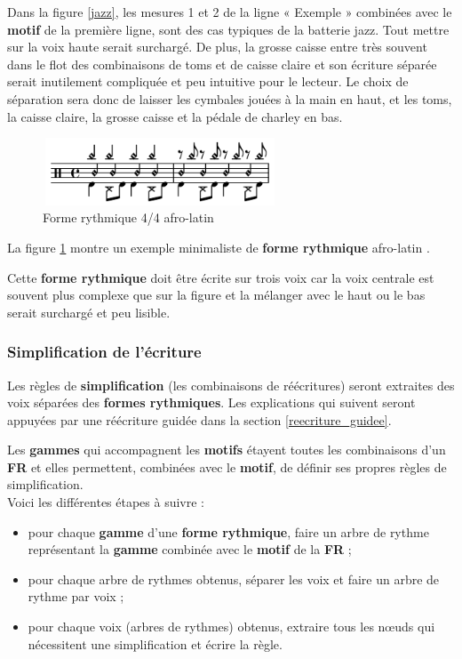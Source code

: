 Dans la figure \ref{jazz}, les mesures 1 et 2 de la ligne « Exemple » combinées
avec le \textbf{motif} de la première ligne, sont des cas typiques de la
batterie jazz. Tout mettre sur la voix haute serait surchargé. De plus, la
grosse caisse entre très souvent dans le flot des combinaisons de toms et de
caisse claire et son écriture séparée serait inutilement compliquée et peu
intuitive pour le lecteur. Le choix de séparation sera donc de laisser les
cymbales jouées à la main en haut, et les toms, la caisse claire, la grosse
caisse et la pédale de charley en bas.

\begin{figure}[h]
	\centering
	\includegraphics[height=20mm, width=70mm]{
    z_images/3_methodes/2_systemes/3_separation_afro-latins.png}
	\caption{Forme rythmique 4/4 afro-latin}
	\label{afro_latin}
\end{figure}

La figure \ref{afro_latin} montre un exemple minimaliste de
\textbf{forme rythmique} afro-latin \cite{system_drums}.

Cette \textbf{forme rythmique} doit être écrite sur trois voix car la voix
centrale est souvent plus complexe que sur la figure et la mélanger avec le
haut ou le bas serait surchargé et peu lisible.

\subsubsection{Simplification de l’écriture}

Les règles de \textbf{simplification} (les combinaisons de réécritures) seront
extraites des voix séparées des \textbf{formes rythmiques}.
Les explications qui suivent seront appuyées par une réécriture guidée dans la
section \ref{reecriture_guidee}.

Les \textbf{gammes} qui accompagnent les \textbf{motifs} étayent toutes les
combinaisons d’un \textbf{FR} et elles permettent, combinées avec le
\textbf{motif}, de définir ses propres règles de simplification.\\

Voici les différentes étapes à suivre :
\begin{itemize}
	\item pour chaque \textbf{gamme} d’une \textbf{forme rythmique}, faire un
        arbre de rythme représentant la \textbf{gamme} combinée avec le
        \textbf{motif} de la \textbf{FR} ;
	\item pour chaque arbre de rythmes obtenus, séparer les voix et faire un
        arbre de rythme par voix ;
	\item pour chaque voix (arbres de rythmes) obtenus, extraire tous les nœuds
        qui nécessitent une simplification et écrire la règle.\\
\end{itemize}

